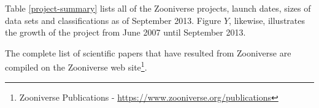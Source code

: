 \documentclass{sigchi}
\begin{document}
Table \ref{project-summary} lists all of the Zooniverse projects,
launch dates, sizes of data sets and classifications as of September
2013.  Figure $Y$, likewise, illustrates the growth of the project
from June 2007 until September 2013.

The complete list of scientific papers that have resulted from
Zooniverse are compiled on the Zooniverse web site\footnote{Zooniverse
  Publications - \url{https://www.zooniverse.org/publications}}.








\end{document}
